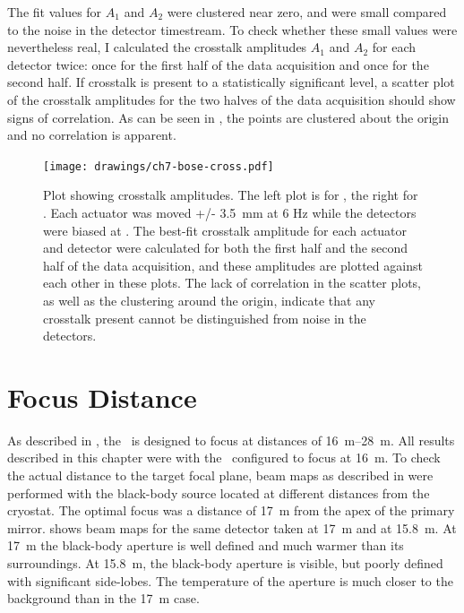 The fit values for $A_1$ and $A_2$ were clustered near zero, and were small compared to the noise in the detector timestream.
To check whether these small values were nevertheless real, I calculated the crosstalk amplitudes $A_1$ and $A_2$ for each detector twice: once for the first half of the data acquisition and once for the second half.
If crosstalk is present to a statistically significant level, a scatter plot of the crosstalk amplitudes for the two halves of the data acquisition should show signs of correlation.
As can be seen in , the points are clustered about the origin and no correlation is apparent.

\begin{figure}
\centering
\texttt{[image: drawings/ch7-bose-cross.pdf]}
\caption[Plot showing crosstalk amplitudes]{
Plot showing crosstalk amplitudes.
The left plot is for , the right for .
Each actuator was moved +/- \SI{3.5}{\mm} at 6 Hz while the detectors were biased at \SOC.
The best-fit crosstalk amplitude for each actuator and detector were calculated for both the first half and the second half of the data acquisition, and these amplitudes are plotted against each other in these plots.
The lack of correlation in the scatter plots, as well as the clustering around the origin, indicate that any crosstalk present cannot be distinguished from noise in the detectors.
}
\label{fig:ch7-bose-cross}
\end{figure}

\section{Focus Distance}\label{sec:ch7-focus-distance}

As described in , the \Imager\ is designed to focus at distances of \SIrange{16}{28}{\m}.
All results described in this chapter were with the \Imager\ configured to focus at 16~m.
To check the actual distance to the target focal plane, beam maps as described in  were performed with the black-body source located at different distances from the cryostat.
The optimal focus was a distance of \SI{17}{\m} from the apex of the primary mirror.
 shows beam maps for the same detector taken at \SI{17}{\m} and at \SI{15.8}{\m}.
At \SI{17}{\m} the black-body aperture is well defined and much warmer than its surroundings.
At \SI{15.8}{\m}, the black-body aperture is visible, but poorly defined with significant side-lobes.
The temperature of the aperture is much closer to the background than in the \SI{17}{\m} case.

